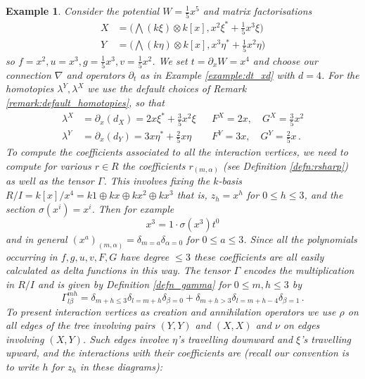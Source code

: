 \documentclass[english,letter paper,12pt,leqno]{article}
\theoremstyle{example}
\newtheorem{example}[theorem]{Example}
\numberwithin{equation}{section}
\begin{document}
\begin{example} Consider the potential $W = \frac{1}{5} x^5$ and matrix factorisations
\begin{align}
X &= \big( \bigwedge(k \xi) \otimes k[x], x^2 \xi^* + \frac{1}{5} x^3 \xi \big)\\
Y &= \big( \bigwedge(k \eta) \otimes k[x], x^3 \eta^* + \frac{1}{5} x^2 \eta \big)
\end{align}
so $f = x^2, u = x^3, g = \frac{1}{5}x^3, v = \frac{1}{5} x^2$. We set $t = \partial_x W = x^4$ and choose our connection $\nabla$ and operators $\partial_t$ as in Example \ref{example:dt_xd} with $d = 4$. For the homotopies $\lambda^Y, \lambda^X$ we use the default choices of Remark \ref{remark:default_homotopies}, so that
\begin{align*}
\lambda^X &= \partial_x( d_X ) = 2 x \xi^* + \frac{3}{5} x^2 \xi && F^X = 2x, \quad G^X = \frac{3}{5} x^2\\
\lambda^Y &= \partial_x( d_Y ) = 3 x \eta^* + \frac{2}{5} x \eta && F^Y = 3x, \quad G^Y = \frac{2}{5} x\,.
\end{align*}
To compute the coefficients associated to all the interaction vertices, we need to compute for various $r \in R$ the coefficients $r_{(m,\alpha)}$ (see Definition \ref{defn:rsharp}) as well as the tensor $\Gamma$. This involves fixing the $k$-basis $R/I = k[x]/x^4 = k1 \oplus kx \oplus kx^2 \oplus kx^3$ that is, $z_h = x^h$ for $0 \le h \le 3$, and the section $\sigma(x^i) = x^i$. Then for example
\[
x^3 = 1 \cdot \sigma( x^3 ) t^0
\]
and in general $(x^a)_{(m,\alpha)} = \delta_{m = a} \delta_{\alpha = 0}$ for $0 \le a \le 3$. Since all the polynomials occurring in $f,g,u,v,F,G$ have degree $\le 3$ these coefficients are all easily calculated as delta functions in this way. The tensor $\Gamma$ encodes the multiplication in $R/I$ and is given by Definition \ref{defn_gamma} for $0 \le m,h \le 3$ by
\[
\Gamma^{mh}_{l \beta} = \delta_{m+h \le 3}\delta_{l = m+h}\delta_{\beta = 0} + \delta_{m+h > 3} \delta_{l = m+h-4} \delta_{\beta = 1}\,.
\]
To present interaction vertices as creation and annihilation operators we use $\rho$ on all edges of the tree involving pairs $(Y,Y)$ and $(X,X)$ and $\nu$ on edges involving $(X,Y)$. Such edges involve $\eta$'s travelling downward and $\xi$'s travelling upward, and the interactions with their coefficients are (recall our convention is to write $h$ for $z_h$ in these diagrams):
\begin{center}
\begin{tabular}{ >{\centering}m{5cm} >{\centering}m{5cm} >{\centering}m{5cm} }

\end{tabular}
\end{center}
\end{example}
\end{document}
